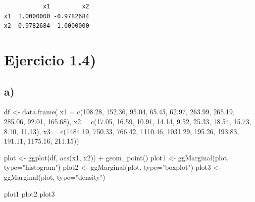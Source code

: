 \documentclass[
]{article}
\newenvironment{Shaded}{\begin{snugshade}}{\end{snugshade}}
\newcommand{\AttributeTok}[1]{\textcolor[rgb]{0.77,0.63,0.00}{#1}}
\newcommand{\FloatTok}[1]{\textcolor[rgb]{0.00,0.00,0.81}{#1}}
\newcommand{\FunctionTok}[1]{\textcolor[rgb]{0.00,0.00,0.00}{#1}}
\newcommand{\NormalTok}[1]{#1}
\newcommand{\OtherTok}[1]{\textcolor[rgb]{0.56,0.35,0.01}{#1}}
\newcommand{\SpecialCharTok}[1]{\textcolor[rgb]{0.00,0.00,0.00}{#1}}
\newcommand{\StringTok}[1]{\textcolor[rgb]{0.31,0.60,0.02}{#1}}
\begin{document}
\begin{verbatim}
           x1         x2
x1  1.0000000 -0.9782684
x2 -0.9782684  1.0000000
\end{verbatim}

\hypertarget{ejercicio-1.4}{%
\section{Ejercicio 1.4)}\label{ejercicio-1.4}}

\hypertarget{a-1}{%
\subsection{a)}\label{a-1}}

\begin{Shaded}
\begin{Highlighting}[]
\NormalTok{df }\OtherTok{\textless{}{-}} \FunctionTok{data.frame}\NormalTok{(}
  \AttributeTok{x1 =} \FunctionTok{c}\NormalTok{(}\FloatTok{108.28}\NormalTok{, }\FloatTok{152.36}\NormalTok{, }\FloatTok{95.04}\NormalTok{, }\FloatTok{65.45}\NormalTok{, }\FloatTok{62.97}\NormalTok{, }\FloatTok{263.99}\NormalTok{, }\FloatTok{265.19}\NormalTok{, }\FloatTok{285.06}\NormalTok{, }\FloatTok{92.01}\NormalTok{, }\FloatTok{165.68}\NormalTok{),}
  \AttributeTok{x2 =} \FunctionTok{c}\NormalTok{(}\FloatTok{17.05}\NormalTok{, }\FloatTok{16.59}\NormalTok{, }\FloatTok{10.91}\NormalTok{, }\FloatTok{14.14}\NormalTok{, }\FloatTok{9.52}\NormalTok{, }\FloatTok{25.33}\NormalTok{, }\FloatTok{18.54}\NormalTok{, }\FloatTok{15.73}\NormalTok{, }\FloatTok{8.10}\NormalTok{, }\FloatTok{11.13}\NormalTok{),}
  \AttributeTok{x3 =} \FunctionTok{c}\NormalTok{(}\FloatTok{1484.10}\NormalTok{, }\FloatTok{750.33}\NormalTok{, }\FloatTok{766.42}\NormalTok{, }\FloatTok{1110.46}\NormalTok{, }\FloatTok{1031.29}\NormalTok{, }\FloatTok{195.26}\NormalTok{, }\FloatTok{193.83}\NormalTok{, }\FloatTok{191.11}\NormalTok{, }\FloatTok{1175.16}\NormalTok{, }\FloatTok{211.15}\NormalTok{))}

\NormalTok{plot }\OtherTok{\textless{}{-}} \FunctionTok{ggplot}\NormalTok{(df, }\FunctionTok{aes}\NormalTok{(x1, x2)) }\SpecialCharTok{+} \FunctionTok{geom\_point}\NormalTok{()}
\NormalTok{plot1 }\OtherTok{\textless{}{-}} \FunctionTok{ggMarginal}\NormalTok{(plot, }\AttributeTok{type=}\StringTok{"histogram"}\NormalTok{)}
\NormalTok{plot2 }\OtherTok{\textless{}{-}} \FunctionTok{ggMarginal}\NormalTok{(plot, }\AttributeTok{type=}\StringTok{"boxplot"}\NormalTok{)}
\NormalTok{plot3 }\OtherTok{\textless{}{-}} \FunctionTok{ggMarginal}\NormalTok{(plot, }\AttributeTok{type=}\StringTok{"density"}\NormalTok{)}

\NormalTok{plot1}
\NormalTok{plot2}
\NormalTok{plot3}
\end{Highlighting}
\end{Shaded}
\end{document}
